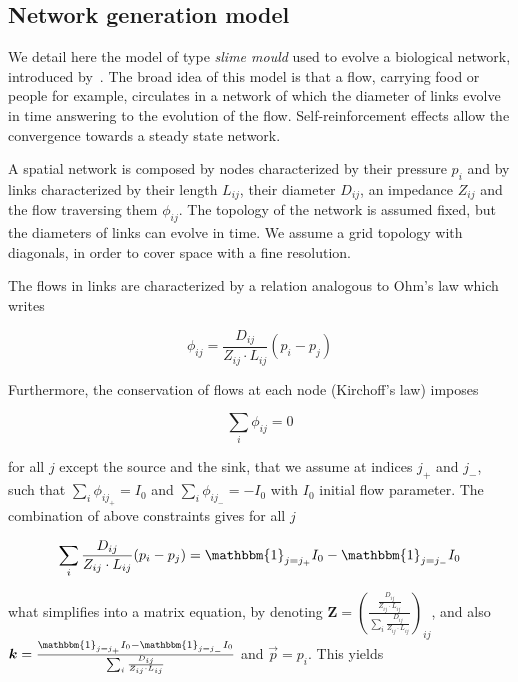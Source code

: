 \documentclass[runningheads,a4paper]{llncs2e/llncs}
\begin{document}
\subsection{Network generation model}


We detail here the model of type \emph{slime mould} used to evolve a biological network, introduced by~\cite{tero2007mathematical}. The broad idea of this model is that a flow, carrying food or people for example, circulates in a network of which the diameter of links evolve in time answering to the evolution of the flow. Self-reinforcement effects allow the convergence towards a steady state network.

A spatial network is composed by nodes characterized by their pressure $p_i$ and by links characterized by their length $L_{ij}$, their diameter $D_{ij}$, an impedance $Z_{ij}$ and the flow traversing them $\phi_{ij}$. The topology of the network is assumed fixed, but the diameters of links can evolve in time. We assume a grid topology with diagonals, in order to cover space with a fine resolution.

The flows in links are characterized by a relation analogous to Ohm's law which writes

\begin{equation}
\phi_{ij} = \frac{D_{ij}}{Z_{ij}\cdot L_{ij}} \left(p_i - p_j\right)
\end{equation}

Furthermore, the conservation of flows at each node (Kirchoff's law) imposes

\begin{equation}
\sum_i \phi_{ij} = 0
\end{equation}

for all $j$ except the source and the sink, that we assume at indices $j_+$ and $j_-$, such that $\sum_i \phi_{ij_+} = I_0$ and $\sum_i \phi_{ij_-} = -I_0$ with $I_0$ initial flow parameter. The combination of above constraints gives for all $j$

\begin{equation}
\sum_i \frac{D_{ij}}{Z_{ij}\cdot L_{ij}} (p_i - p_j) = \mathbbm{1}_{j=j_+} I_0 - \mathbbm{1}_{j=j_-} I_0 
\end{equation}

what simplifies into a matrix equation, by denoting $\mathbf{Z} = \left(\frac{\frac{D_{ij}}{Z_{ij}\cdot L_{ij}}}{\sum_i \frac{D_{ij}}{Z_{ij}\cdot L_{ij}}}\right)_{ij}$, and also $\vec{k} = \frac{\mathbbm{1}_{j=j_+} I_0 - \mathbbm{1}_{j=j_-} I_0 }{\sum_i \frac{D_{ij}}{Z_{ij}\cdot L_{ij}}}$ and $\vec{p} = p_i$. This yields
\end{document}
